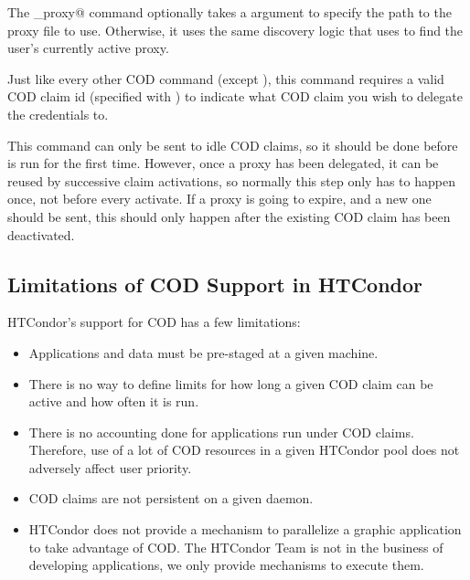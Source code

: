 The \verb@delegate_proxy@ command optionally takes a 
argument to specify the path to the proxy file to use.
Otherwise, it uses the same discovery logic that  uses
to find the user's currently active proxy.

Just like every other COD command (except \verb@request@), this
command requires a valid COD claim id (specified with ) to
indicate what COD claim you wish to delegate the credentials to.

This command can only be sent to idle COD claims, so it should be done
before \verb@activate@ is run for the first time.
However, once a proxy has been delegated, it can be reused by
successive claim activations, so normally this step only has to happen
once, not before every activate.
If a proxy is going to expire, and a new one should be sent, this
should only happen after the existing COD claim has been deactivated.


\subsection{\label{sec:cod-limitations}Limitations of COD Support in HTCondor}

HTCondor's support for COD has a few limitations:

\begin{itemize}

\item Applications and data must be pre-staged at a given machine. 

\item There is no way to define limits for how long a given COD claim
  can be active and how often it is run.

\item There is no accounting done for applications run under COD claims.
  Therefore, use of a lot of COD resources in a given HTCondor pool
  does not adversely affect user priority.

\item COD claims are not persistent on a given  daemon.

\item HTCondor does not provide a mechanism to parallelize a graphic
  application to take advantage of COD.  
  The HTCondor Team is not in the business of developing applications,
  we only provide mechanisms to execute them.

\end{itemize}
